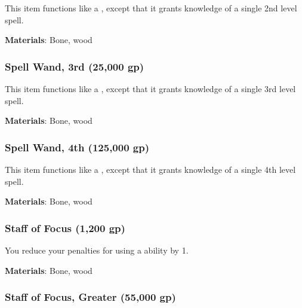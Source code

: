 This item functions like a , except that it grants knowledge of a single 2nd level spell.



\vspace{0.25em}
\textbf{Materials}: Bone, wood


\lowercase{\hypertarget{item:Spell Wand, 3rd}{}}\label{item:Spell Wand, 3rd}
\hypertarget{item:Spell Wand, 3rd}{\subsubsection{Spell Wand, 3rd\hfill{} (25,000 gp)}}

This item functions like a , except that it grants knowledge of a single 3rd level spell.



\vspace{0.25em}
\textbf{Materials}: Bone, wood


\lowercase{\hypertarget{item:Spell Wand, 4th}{}}\label{item:Spell Wand, 4th}
\hypertarget{item:Spell Wand, 4th}{\subsubsection{Spell Wand, 4th\hfill{} (125,000 gp)}}

This item functions like a , except that it grants knowledge of a single 4th level spell.



\vspace{0.25em}
\textbf{Materials}: Bone, wood


\lowercase{\hypertarget{item:Staff of Focus}{}}\label{item:Staff of Focus}
\hypertarget{item:Staff of Focus}{\subsubsection{Staff of Focus\hfill{} (1,200 gp)}}

You reduce your penalties for using a  ability by 1.



\vspace{0.25em}
\textbf{Materials}: Bone, wood


\lowercase{\hypertarget{item:Staff of Focus, Greater}{}}\label{item:Staff of Focus, Greater}
\hypertarget{item:Staff of Focus, Greater}{\subsubsection{Staff of Focus, Greater\hfill{} (55,000 gp)}}

